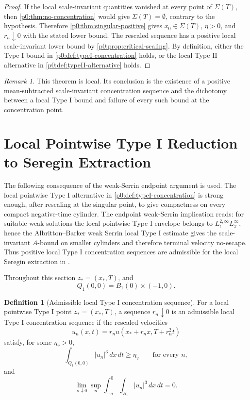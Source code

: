 \documentclass[11pt]{amsart}
\theoremstyle{plain}
\theoremstyle{definition}
\newtheorem{definition}[definition]{Definition}
\theoremstyle{remark}
\newtheorem{remark}[remark]{Remark}
\numberwithin{equation}{section}
\begin{document}
\begin{proof}
If the local scale-invariant quantities vanished at every point of
\(\Sigma(T)\), then \cref{p0:thm:no-concentration} would give
\(\Sigma(T)=\emptyset\), contrary to the hypothesis.  Therefore
\cref{p0:thm:singular-positive} gives
\(x_0\in\Sigma(T)\), \(\eta>0\), and \(r_n\downarrow0\) with the stated lower
bound.  The rescaled sequence has a positive local scale-invariant lower bound
by \cref{p0:prop:critical-scaling}.  By definition, either the Type I bound in
\cref{p0:def:typeI-concentration} holds, or the local Type II alternative in
\cref{p0:def:typeII-alternative} holds.
\end{proof}

\begin{remark}
This theorem is local.  Its conclusion is the existence of a positive
mean-subtracted scale-invariant concentration sequence and the dichotomy
between a local Type I bound and failure of every such bound at the
concentration point.
\end{remark}

\section{Local Pointwise Type I Reduction to Seregin Extraction}
\label{p0:sec:local-typeI-terminal-bridge-paper0}

The following consequence of the weak-Serrin endpoint argument is used.
The local pointwise Type I alternative in
\cref{p0:def:typeI-concentration} is strong enough, after rescaling at the singular
point, to give compactness on every compact negative-time cylinder.  The
endpoint weak-Serrin implication reads:
for suitable weak solutions the local pointwise Type I envelope belongs to
\(L^{2,\infty}_tL^\infty_x\), hence the Albritton--Barker weak Serrin local
Type I estimate gives the scale-invariant \(A\)-bound on smaller cylinders and
therefore terminal velocity no-escape.  Thus positive local Type I
concentration sequences are admissible for the local Seregin extraction in
.

Throughout this section \(z_*=(x_*,T)\), and
\[
  Q_1(0,0)=B_1(0)\times(-1,0).
\]

\begin{definition}[Admissible local Type I concentration sequence]
\label{p0:def:paper0-admissible-local-bridge-sequence}
For a local pointwise Type I point \(z_*=(x_*,T)\), a sequence
\(r_n\downarrow0\) is an admissible local Type I concentration sequence if the rescaled
velocities
\[
  u_n(x,t)=r_nu(x_*+r_nx,T+r_n^2t)
\]
satisfy, for some \(\eta_v>0\),
\[
   \int_{Q_1(0,0)} |u_n|^3\,dx\,dt\ge\eta_v
   \qquad\text{for every }n,
\]
and
\[
   \lim_{\sigma\downarrow0}
   \sup_n
   \int_{-\sigma}^{0}\int_{B_1}|u_n|^3\,dx\,dt=0 .
\]
\end{definition}
\end{document}
